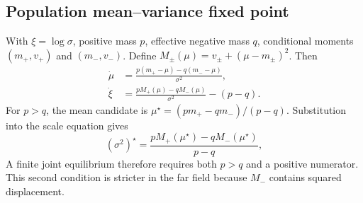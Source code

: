 
\subsection{Population mean--variance fixed point}
With $\xi=\log\sigma$, positive mass $p$, effective negative mass $q$, conditional moments $(m_+,v_+)$ and $(m_-,v_-)$. Define $M_\pm(\mu)=v_\pm+(\mu-m_\pm)^2$. Then
\begin{align}
\dot\mu &= \frac{p(m_+-\mu)-q(m_--\mu)}{\sigma^2},\\
\dot\xi &= \frac{pM_+(\mu)-qM_-(\mu)}{\sigma^2}-(p-q).
\end{align}
For $p>q$, the mean candidate is $\mu^\star=(pm_+-qm_-)/(p-q)$. Substitution into the scale equation gives
\begin{equation}
(\sigma^2)^\star=\frac{pM_+(\mu^\star)-qM_-(\mu^\star)}{p-q},
\end{equation}
A finite joint equilibrium therefore requires both $p>q$ and a positive numerator. This second condition is stricter in the far field because $M_-$ contains squared displacement.

